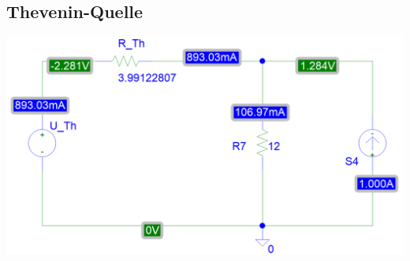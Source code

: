 \documentclass[11pt]{scrartcl}
\begin{document}
\subsection{Thevenin-Quelle}
\begin{center}
  \includegraphics[width=1\linewidth]{./Assets/simulation_thevenin}
  \label{fig:sim_thevenin}
\end{center}
\end{document}
